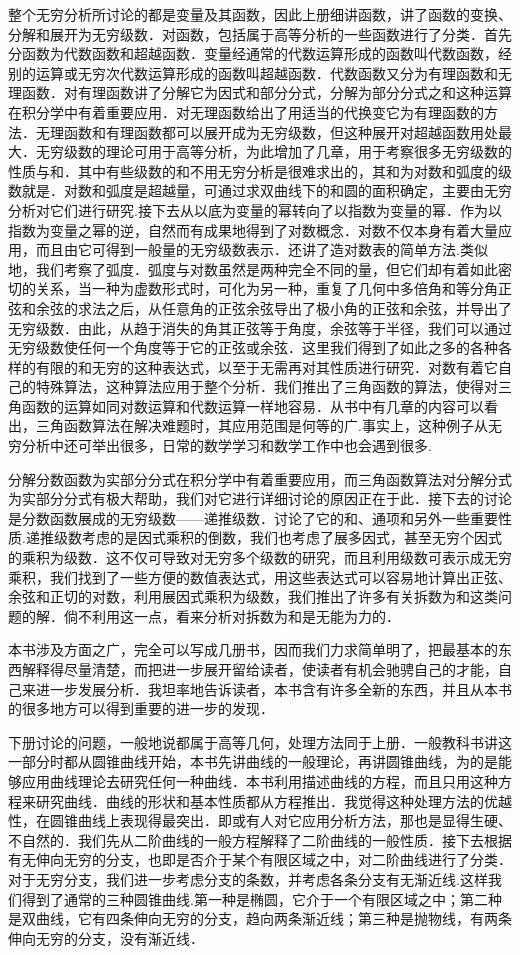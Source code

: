 整个无穷分析所讨论的都是变量及其函数，因此上册细讲函数，讲了函数的变换、分解和展开为无穷级数．对函数，包括属于高等分析的一些函数进行了分类．首先分函数为代数函数和超越函数．变量经通常的代数运算形成的函数叫代数函数，经别的运算或无穷次代数运算形成的函数叫超越函数．代数函数又分为有理函数和无理函数．对有理函数讲了分解它为因式和部分分式，分解为部分分式之和这种运算在积分学中有着重要应用．对无理函数给出了用适当的代换变它为有理函数的方法．无理函数和有理函数都可以展开成为无穷级数，但这种展开对超越函数用处最大．无穷级数的理论可用于高等分析，为此增加了几章，用于考察很多无穷级数的性质与和．其中有些级数的和不用无穷分析是很难求出的，其和为对数和弧度的级数就是．对数和弧度是超越量，可通过求双曲线下的和圆的面积确定，主要由无穷分析对它们进行研究.接下去从以底为变量的幂转向了以指数为变量的幂．作为以指数为变量之幂的逆，自然而有成果地得到了对数概念．对数不仅本身有着大量应用，而且由它可得到一般量的无穷级数表示．还讲了造对数表的简单方法.类似地，我们考察了弧度．弧度与对数虽然是两种完全不同的量，但它们却有着如此密切的关系，当一种为虚数形式时，可化为另一种，重复了几何中多倍角和等分角正弦和余弦的求法之后，从任意角的正弦余弦导出了极小角的正弦和余弦，并导出了无穷级数．由此，从趋于消失的角其正弦等于角度，余弦等于半径，我们可以通过无穷级数使任何一个角度等于它的正弦或余弦．这里我们得到了如此之多的各种各样的有限的和无穷的这种表达式，以至于无需再对其性质进行研究．对数有着它自己的特殊算法，这种算法应用于整个分析．我们推出了三角函数的算法，使得对三角函数的运算如同对数运算和代数运算一样地容易．从书中有几章的内容可以看出，三角函数算法在解决难题时，其应用范围是何等的广.事实上，这种例子从无穷分析中还可举出很多，日常的数学学习和数学工作中也会遇到很多.

分解分数函数为实部分分式在积分学中有着重要应用，而三角函数算法对分解分式为实部分分式有极大帮助，我们对它进行详细讨论的原因正在于此．接下去的讨论是分数函数展成的无穷级数——递推级数．讨论了它的和、通项和另外一些重要性质.递推级数考虑的是因式乘积的倒数，我们也考虑了展多因式，甚至无穷个因式的乘积为级数．这不仅可导致对无穷多个级数的研究，而且利用级数可表示成无穷乘积，我们找到了一些方便的数值表达式，用这些表达式可以容易地计算出正弦、余弦和正切的对数，利用展因式乘积为级数，我们推出了许多有关拆数为和这类问题的解．倘不利用这一点，看来分析对拆数为和是无能为力的．

本书涉及方面之广，完全可以写成几册书，因而我们力求简单明了，把最基本的东西解释得尽量清楚，而把进一步展开留给读者，使读者有机会驰骋自己的才能，自己来进一步发展分析．我坦率地告诉读者，本书含有许多全新的东西，并且从本书的很多地方可以得到重要的进一步的发现．

下册讨论的问题，一般地说都属于高等几何，处理方法同于上册．一般教科书讲这一部分时都从圆锥曲线开始，本书先讲曲线的一般理论，再讲圆锥曲线，为的是能够应用曲线理论去研究任何一种曲线．本书利用描述曲线的方程，而且只用这种方程来研究曲线．曲线的形状和基本性质都从方程推出．我觉得这种处理方法的优越性，在圆锥曲线上表现得最突出．即或有人对它应用分析方法，那也是显得生硬、不自然的．我们先从二阶曲线的一般方程解释了二阶曲线的一般性质．接下去根据有无伸向无穷的分支，也即是否介于某个有限区域之中，对二阶曲线进行了分类．对于无穷分支，我们进一步考虑分支的条数，并考虑各条分支有无渐近线.这样我们得到了通常的三种圆锥曲线.第一种是椭圆，它介于一个有限区域之中；第二种是双曲线，它有四条伸向无穷的分支，趋向两条渐近线；第三种是抛物线，有两条伸向无穷的分支，没有渐近线．

